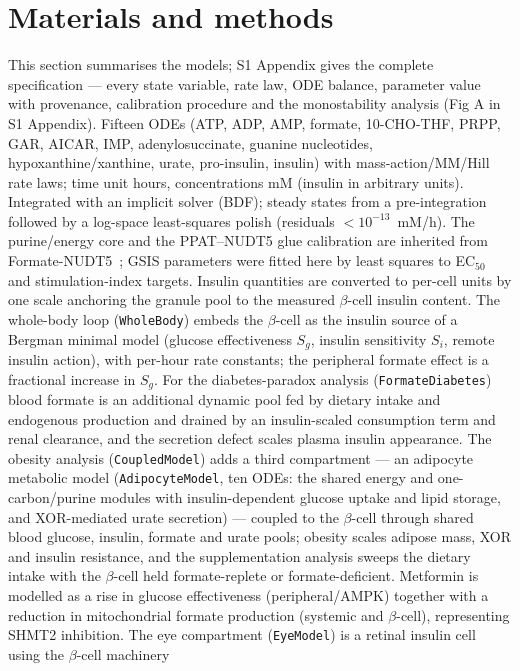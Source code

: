 \documentclass[10pt,letterpaper]{article}
\begin{document}
\section*{Materials and methods}
This section summarises the models; S1 Appendix gives the complete
specification --- every state variable, rate law, ODE balance, parameter value with
provenance, calibration procedure and the monostability analysis (Fig A in S1 Appendix).
Fifteen ODEs (ATP, ADP, AMP, formate, 10-CHO-THF, PRPP, GAR, AICAR, IMP,
adenylosuccinate, guanine nucleotides, hypoxanthine/xanthine, urate, pro-insulin,
insulin) with
mass-action/MM/Hill rate laws; time unit hours, concentrations mM (insulin in
arbitrary units). Integrated with an implicit solver (BDF); steady states from a
pre-integration followed by a log-space least-squares polish (residuals
$<10^{-13}$~mM/h). The purine/energy core and the PPAT--NUDT5 glue calibration
are inherited from Formate-NUDT5~\cite{vazqueznudt5}; GSIS parameters were
fitted here by least squares to EC$_{50}$ and stimulation-index targets.
Insulin quantities are converted to per-cell units by one scale anchoring the
granule pool to the measured $\beta$-cell insulin content. The whole-body loop
(\texttt{WholeBody}) embeds the $\beta$-cell as the insulin source of a
Bergman minimal model (glucose effectiveness $S_g$, insulin sensitivity $S_i$,
remote insulin action), with per-hour rate constants; the peripheral formate
effect is a fractional increase in $S_g$. For the diabetes-paradox analysis
(\texttt{FormateDiabetes}) blood formate is an additional dynamic pool fed by
dietary intake and endogenous production and drained by an insulin-scaled
consumption term and renal clearance, and the secretion defect scales plasma
insulin appearance. The obesity analysis (\texttt{CoupledModel}) adds a
third compartment --- an adipocyte metabolic model (\texttt{AdipocyteModel}, ten
ODEs: the shared energy and one-carbon/purine modules with insulin-dependent
glucose uptake and lipid storage, and XOR-mediated urate secretion) --- coupled
to the $\beta$-cell through shared blood glucose, insulin, formate and urate
pools; obesity scales adipose mass, XOR and insulin resistance, and the supplementation
analysis sweeps the dietary intake with the $\beta$-cell held formate-replete or
formate-deficient. Metformin is modelled as a rise in glucose effectiveness
(peripheral/AMPK) together with a reduction in mitochondrial formate production
(systemic and $\beta$-cell), representing SHMT2 inhibition. The eye compartment
(\texttt{EyeModel}) is a retinal insulin cell using the $\beta$-cell machinery
\end{document}
